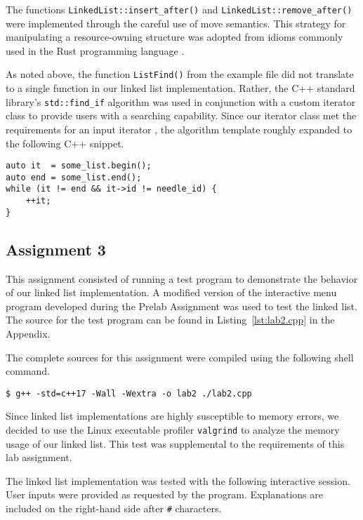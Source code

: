 \documentclass[11pt, letterpaper]{article} %
\begin{document}
The functions \texttt{LinkedList::insert\_after()} and \texttt{LinkedList::remove\_after()} were implemented through the careful use of move semantics. This strategy for manipulating a resource-owning structure was adopted from idioms commonly used in the Rust programming language \cite{rust-lang}.

As noted above, the function \texttt{ListFind()} from the example file did not translate to a single function in our linked list implementation. Rather, the C++ standard library's \texttt{std::find\_if} algorithm was used in conjunction with a custom iterator class to provide users with a searching capability. Since our iterator class met the requirements for an input iterator \cite[\S27.2.3]{open-std-N4659}, the algorithm template roughly expanded to the following C++ snippet.
\begin{lstlisting}[style=labreportstyle-c++]
auto it  = some_list.begin();
auto end = some_list.end();
while (it != end && it->id != needle_id) {
    ++it;
}
\end{lstlisting}



\subsection*{Assignment 3}\label{sec:assign-3}

This assignment consisted of running a test program to demonstrate the behavior of our linked list implementation. A modified version of the interactive menu program developed during the Prelab Assignment was used to test the linked list. The source for the test program can be found in Listing~\ref{lst:lab2.cpp} in the Appendix.

The complete sources for this assignment were compiled using the following shell command.
\begin{lstlisting}[style=labreportstyle-sh]
$ g++ -std=c++17 -Wall -Wextra -o lab2 ./lab2.cpp
\end{lstlisting}

Since linked list implementations are highly susceptible to memory errors, we decided to use the Linux executable profiler \texttt{valgrind} \cite{valgrind} to analyze the memory usage of our linked list. This test was supplemental to the requirements of this lab assignment. 

The linked list implementation was tested with the following interactive session. User inputs were provided as requested by the program. Explanations are included on the right-hand side after \texttt{\#} characters.
\end{document}
